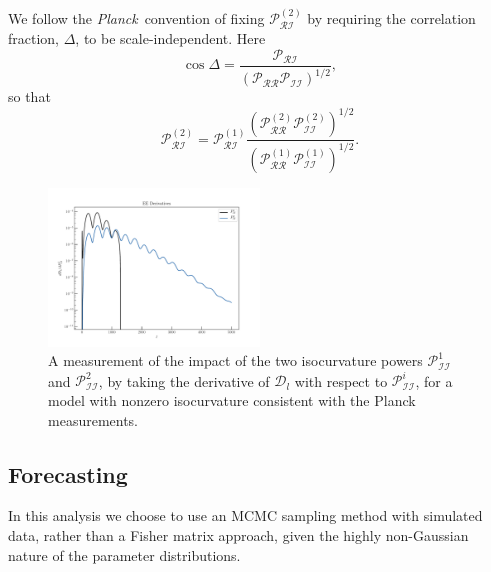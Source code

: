 \documentclass{emulateapj}
\newcommand{\planck}{{\it Planck}}
\newcommand{\prr}{ \mathcal{P}_{\mathcal{R}\mathcal{R}} }
\newcommand{\pri}{ \mathcal{P}_{\mathcal{R}\mathcal{I}} }
\newcommand{\pii}{ \mathcal{P}_{\mathcal{I}\mathcal{I}} }
\begin{document}
We follow the \planck\ convention of fixing $\pri^{(2)}$ by requiring the correlation fraction, $\Delta$, to be scale-independent. Here
\begin{equation}
\cos \Delta = \frac{\pri}{(\prr \pii)^{1/2}}, %
\end{equation}
so that
\begin{equation}
\pri^{(2)} = \pri^{(1)} \frac{\left(\prr^{(2)} \pii^{(2)} \right)^{1/2}}{ \left(\prr^{(1)} \pii^{(1)} \right)^{1/2}}.
\end{equation}



\begin{figure}
\includegraphics[width=0.5\textwidth]{figures/logee.pdf}
\caption{A measurement of the impact of the two isocurvature powers $\pii^1$ and $\pii^2$, by taking the derivative of $\mathcal{D}_l$ with respect to $\pii^i$, for a model with nonzero isocurvature consistent with the Planck measurements.\label{fig:derivs}}
\end{figure}

\subsection{Forecasting}\label{forecasting}

In this analysis we choose to use an MCMC sampling method with simulated data, rather than a Fisher matrix approach, given the highly non-Gaussian nature of the parameter distributions.
\end{document}
